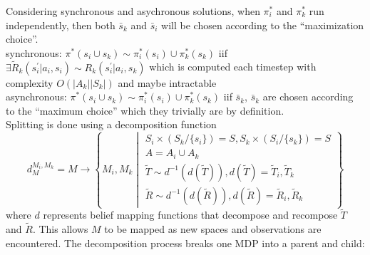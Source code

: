 Considering synchronous and asychronous solutions, when $\pi^\ast_i$ and $\pi^\ast_k$ run independently, then both $\bar{s}_k$ and $\bar{s}_i$ will be chosen according to the ``maximization choice''.\\

synchronous: $\pi^\ast(s_i \cup s_k) \sim \pi^\ast_i(s_i) \cup \pi^\ast_k(s_k)$ iif $\exists \tilde{R}_k(s^\prime_i|a_i,s_i)\sim R_k(s^\prime_i|a_i,s_k)$ which is computed each timestep with complexity $O(|A_k||S_k|)$ and maybe intractable \\

asynchronous: $\pi^\ast(s_i \cup s_k)\sim\pi^\ast_i(s_i)\cup\pi^\ast_k(s_k)$ iif $\bar{s}_k$, $\bar{s}_k$ are chosen according to the ``maximum choice'' which they trivially are by definition.\\




Splitting is done using a decomposition function
\begin{equation*}
d^{M_i,M_k}_{M} = M \longrightarrow \left\{    M_i, M_k \middle|
\begin{array}{l}
S_i \times ( S_k / \{s_i\} ) = S, S_k \times ( S_i / \{ s_k \} ) = S \\
A=A_i \cup A_k\\
\tilde{T}\sim d^{-1}(d(\tilde{T})),d(\tilde{T})=\tilde{T}_i, \tilde{T}_k\\
\tilde{R}\sim d^{-1}(d(\tilde{R})), d(\tilde{R})=\tilde{R}_i,\tilde{R}_k
\end{array}
 \right\}
\end{equation*}
where $d$ represents belief mapping functions that decompose and recompose $\tilde{T}$ and $\tilde{R}$. This allows  $M$ to be mapped as new spaces and observations are encountered. The decomposition process breaks one MDP into a parent and child:\\

\begin{center}
\end{center}



